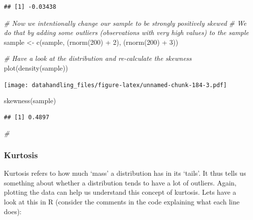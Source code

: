 \documentclass[
  12pt,
]{style/krantz}
\newenvironment{Shaded}{\begin{snugshade}}{\end{snugshade}}
\newcommand{\CommentTok}[1]{\textcolor[rgb]{0.56,0.35,0.01}{\textit{#1}}}
\newcommand{\DecValTok}[1]{\textcolor[rgb]{0.00,0.00,0.81}{#1}}
\newcommand{\FunctionTok}[1]{\textcolor[rgb]{0.00,0.00,0.00}{#1}}
\newcommand{\NormalTok}[1]{#1}
\newcommand{\OtherTok}[1]{\textcolor[rgb]{0.56,0.35,0.01}{#1}}
\newcommand{\SpecialCharTok}[1]{\textcolor[rgb]{0.00,0.00,0.00}{#1}}
\begin{document}
\begin{verbatim}
## [1] -0.03438
\end{verbatim}

\begin{Shaded}
\begin{Highlighting}[]
\CommentTok{\# Now we intentionally change our sample to be strongly positively skewed}
\CommentTok{\# We do that by adding some outliers (observations with very high values) to the sample }
\NormalTok{sample }\OtherTok{\textless{}{-}} \FunctionTok{c}\NormalTok{(sample, (}\FunctionTok{rnorm}\NormalTok{(}\DecValTok{200}\NormalTok{) }\SpecialCharTok{+} \DecValTok{2}\NormalTok{), (}\FunctionTok{rnorm}\NormalTok{(}\DecValTok{200}\NormalTok{) }\SpecialCharTok{+} \DecValTok{3}\NormalTok{))}

\CommentTok{\# Have a look at the distribution and re{-}calculate the skewness}
\FunctionTok{plot}\NormalTok{(}\FunctionTok{density}\NormalTok{(sample))}
\end{Highlighting}
\end{Shaded}

\texttt{[image: datahandling\_files/figure-latex/unnamed-chunk-184-3.pdf]}

\begin{Shaded}
\begin{Highlighting}[]
\FunctionTok{skewness}\NormalTok{(sample)}
\end{Highlighting}
\end{Shaded}

\begin{verbatim}
## [1] 0.4897
\end{verbatim}

\begin{Shaded}
\begin{Highlighting}[]
\CommentTok{\#}
\end{Highlighting}
\end{Shaded}

\hypertarget{kurtosis}{%
\subsubsection{Kurtosis}\label{kurtosis}}

Kurtosis refers to how much `mass' a distribution has in its `tails'. It thus tells us something about whether a distribution tends to have a lot of outliers. Again, plotting the data can help us understand this concept of kurtosis. Lets have a look at this in R (consider the comments in the code explaining what each line does):
\end{document}
